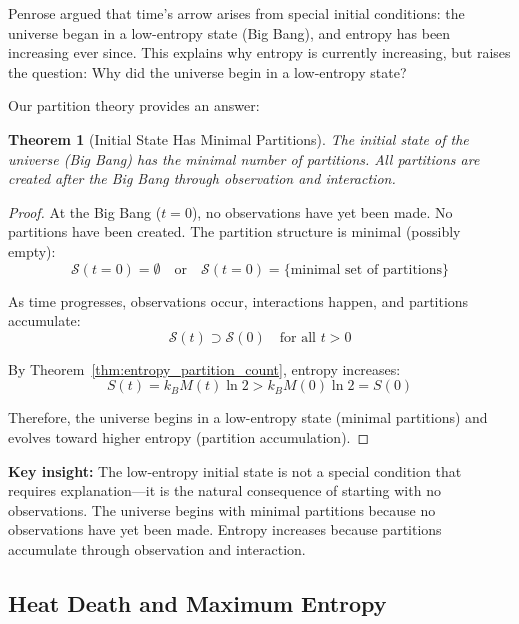 \documentclass[twocolumn,10pt]{article}
\newtheorem{theorem}{Theorem}[section]
\theoremstyle{definition}
\theoremstyle{remark}
\begin{document}
Penrose\cite{penrose1989} argued that time's arrow arises from special initial conditions: the universe began in a low-entropy state (Big Bang), and entropy has been increasing ever since. This explains why entropy is currently increasing, but raises the question: Why did the universe begin in a low-entropy state?

\vspace{0.2cm}
\noindent Our partition theory provides an answer:

\begin{theorem}[Initial State Has Minimal Partitions]
\label{thm:initial_minimal_partitions}
The initial state of the universe (Big Bang) has the minimal number of partitions. All partitions are created after the Big Bang through observation and interaction.
\end{theorem}

\begin{proof}
At the Big Bang ($t = 0$), no observations have yet been made. No partitions have been created. The partition structure is minimal (possibly empty):
\begin{equation}
\mathcal{S}(t=0) = \emptyset \quad \text{or} \quad \mathcal{S}(t=0) = \{\text{minimal set of partitions}\}
\end{equation}

As time progresses, observations occur, interactions happen, and partitions accumulate:
\begin{equation}
\mathcal{S}(t) \supset \mathcal{S}(0) \quad \text{for all } t > 0
\end{equation}

By Theorem~\ref{thm:entropy_partition_count}, entropy increases:
\begin{equation}
S(t) = k_B M(t) \ln 2 > k_B M(0) \ln 2 = S(0)
\end{equation}

Therefore, the universe begins in a low-entropy state (minimal partitions) and evolves toward higher entropy (partition accumulation).
\end{proof}

\noindent\textbf{Key insight:} The low-entropy initial state is not a special condition that requires explanation—it is the natural consequence of starting with no observations. The universe begins with minimal partitions because no observations have yet been made. Entropy increases because partitions accumulate through observation and interaction.

\subsection{Heat Death and Maximum Entropy}
\end{document}
